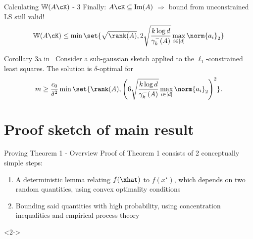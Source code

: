 \documentclass[10pt]{beamer}
\newcommand{\xstar}{x^{\star}}
\begin{document}
\begin{frame}{Calculating $\mathbb{W}(A \cK)$ - 3}
    Finally: $A \cK \subseteq \mathrm{Im}(A)$ $\Rightarrow$ bound from
    unconstrained LS still valid!
    \[
        \mathbb{W}(A\cK) \leq \min\set{\sqrt{\rank(A)},
        2 \sqrt{\frac{k \log d}{\gamma_k^-(A)}} \max_{i \in [d]} \norm{a_i}_2}
    \]
    \begin{block}{Corollary 3a in~\cite{PilWain15}}
        Consider a sub-gaussian sketch applied to the $\ell_1$-constrained
        least squares. The solution is $\delta$-optimal for
        \[
            m \geq \frac{c_0}{\delta^2} \min\set{\rank(A),
            \left( 6 \sqrt{\frac{k \log d}{\gamma_k^-(A)}} \max_{i \in [d]}
            \norm{a_i}_2 \right)^2}.
        \]
    \end{block}
\end{frame}

\section{Proof sketch of main result}

\begin{frame}{Proving Theorem 1 - Overview}
    Proof of Theorem 1 consists of 2 conceptually simple steps:
    \begin{enumerate}
    \item<1-> A deterministic lemma relating $f(\xhat)$ to $f(\xstar)$, which
        depends on two random quantities, using convex optimality conditions
    \item<2-> Bounding said quantities with high probability, using
        concentration inequalities and empirical process theory
    \end{enumerate}
    <2->
\end{frame}
\end{document}
